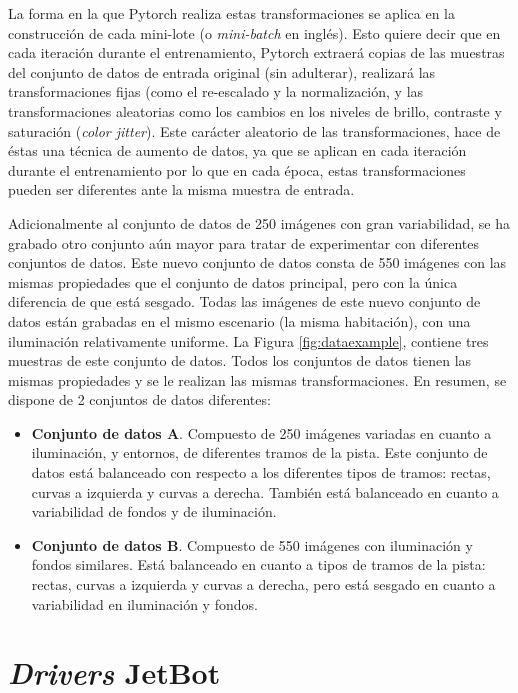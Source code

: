 La forma en la que Pytorch realiza estas transformaciones se aplica en la construcción de cada mini-lote (o \textit{mini-batch} en inglés). Esto quiere decir que en cada iteración durante el entrenamiento, Pytorch extraerá copias de las muestras del conjunto de datos de entrada original (sin adulterar), realizará las transformaciones fijas (como el re-escalado y la normalización, y las transformaciones aleatorias como los cambios en los niveles de brillo, contraste y saturación (\textit{color jitter}). Este carácter aleatorio de las transformaciones, hace de éstas una técnica de aumento de datos, ya que se aplican en cada iteración durante el entrenamiento por lo que en cada época, estas transformaciones pueden ser diferentes ante la misma muestra de entrada.

Adicionalmente al conjunto de datos de 250 imágenes con gran variabilidad, se ha grabado otro conjunto aún mayor para tratar de experimentar con diferentes conjuntos de datos. Este nuevo conjunto de datos consta de 550 imágenes con las mismas propiedades que el conjunto de datos principal, pero con la única diferencia de que está sesgado. Todas las imágenes de este nuevo conjunto de datos están grabadas en el mismo escenario (la misma habitación), con una iluminación relativamente uniforme. La Figura \ref{fig:dataexample}, contiene tres muestras de este conjunto de datos. Todos los conjuntos de datos tienen las mismas propiedades y se le realizan las mismas transformaciones. En resumen, se dispone de 2 conjuntos de datos diferentes:

\begin{itemize}
    \item \textbf{Conjunto de datos A}. Compuesto de 250 imágenes variadas en cuanto a iluminación, y entornos, de diferentes tramos de la pista. Este conjunto de datos está balanceado con respecto a los diferentes tipos de tramos: rectas, curvas a izquierda y curvas a derecha. También está balanceado en cuanto a variabilidad de fondos y de iluminación.
    \item \textbf{Conjunto de datos B}. Compuesto de 550 imágenes con iluminación y fondos similares. Está balanceado en cuanto a tipos de tramos de la pista: rectas, curvas a izquierda y curvas a derecha, pero está sesgado en cuanto a variabilidad en iluminación y fondos.
\end{itemize}

\section{\textit{Drivers} JetBot}

